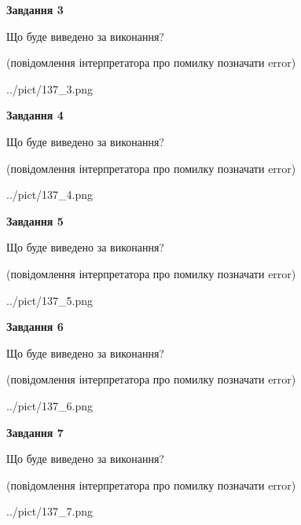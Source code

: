 \documentclass[12pt, ukrainian]{article}
\begin{document}
{\begin {large}
{\begin {center}\textbf{Завдання 3}\end {center}}\par
Що буде виведено за виконання?\par
 (повідомлення інтерпретатора про помилку позначати error)\par
\begin{center}
	{../pict/137_3.png}
\end{center}
\newpage

{\begin {center}\textbf{Завдання 4}\end {center}}\par
Що буде виведено за виконання?\par
 (повідомлення інтерпретатора про помилку позначати error)\par
\begin{center}
	{../pict/137_4.png}
\end{center}
\newpage

{\begin {center}\textbf{Завдання 5}\end {center}}\par
Що буде виведено за виконання?\par
 (повідомлення інтерпретатора про помилку позначати error)\par
\begin{center}
	{../pict/137_5.png}
\end{center}
\newpage

{\begin {center}\textbf{Завдання 6}\end {center}}\par
Що буде виведено за виконання?\par
 (повідомлення інтерпретатора про помилку позначати error)\par
\begin{center}
	{../pict/137_6.png}
\end{center}
\newpage

{\begin {center}\textbf{Завдання 7}\end {center}}\par
Що буде виведено за виконання?\par
 (повідомлення інтерпретатора про помилку позначати error)\par
\begin{center}
	{../pict/137_7.png}
\end{center}
\newpage


\end{large}}
\end{document}
